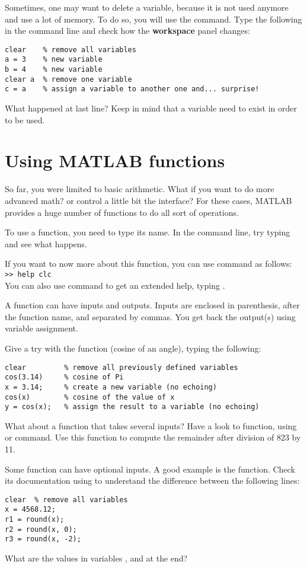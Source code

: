 \documentclass{article}
\begin{document}
Sometimes, one may want to delete a variable, because it is not used anymore and use a lot of memory.
To do so, you will use the  command.
Type the following in the command line and check how the \textbf{workspace} panel changes:
\begin{lstlisting}
clear    % remove all variables
a = 3    % new variable
b = 4    % new variable
clear a  % remove one variable
c = a    % assign a variable to another one and... surprise!
\end{lstlisting}
What happened at last line? Keep in mind that a variable need to exist in order to be used.


\section{Using MATLAB functions}

So far, you were limited to basic arithmetic.
What if you want to do more advanced math? or control a little bit the interface?
For these cases, MATLAB provides a huge number of functions to do all sort of operations.

To use a function, you need to type its name.
In the command line, try typing  and see what happens.

If you want to now more about this function, you can use  command as follows: \\
\verb|>> help clc| \\
You can also use  command to get an extended help, typing .

A function can have inputs and outputs.
Inputs are enclosed in parenthesis, after the function name, and separated by commas.
You get back the output(s) using variable assignment.

Give a try with the  function (cosine of an angle), typing the following:
\begin{lstlisting}
clear         % remove all previously defined variables
cos(3.14)     % cosine of Pi
x = 3.14;     % create a new variable (no echoing)
cos(x)        % cosine of the value of x
y = cos(x);   % assign the result to a variable (no echoing)
\end{lstlisting}

What about a function that takes several inputs?
Have a look to  function, using  or  command.
Use this function to compute the remainder after division of 823 by 11.

Some function can have optional inputs.
A good example is the  function.
Check its documentation using  to understand the difference between the following lines:
\begin{lstlisting}
clear  % remove all variables
x = 4568.12;
r1 = round(x);
r2 = round(x, 0);
r3 = round(x, -2);
\end{lstlisting}
What are the values in variables ,  and  at the end?
\end{document}
